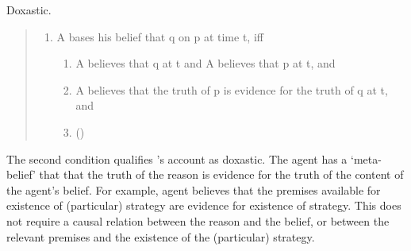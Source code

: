 \begin{note}[Doxastic]
  Doxastic.
  \cite{Tolliver:1982us}

  \begin{quote}
    \begin{enumerate}[label=(B)]
    \item A bases his belief that q on p at time t, iff
      \begin{enumerate}[label=(\arabic*)]
      \item A believes that q at t and A believes that p at t, and
      \item A believes that the truth of p is evidence for the truth of q at t, and
      \item \space[\dots]\footnotemark
        \mbox{}\hfill\mbox{(\citeyear[159]{Tolliver:1982us})}
      \end{enumerate}
    \end{enumerate}
    \end{quote}
    The second condition qualifies \citeauthor{Tolliver:1982us}'s account as doxastic.
    The agent has a `meta-belief' that that the truth of the reason is evidence for the truth of the content of the agent's belief.
    For example, agent believes that the premises available for existence of (particular) strategy are evidence for existence of strategy.
    This does not require a causal relation between the reason and the belief, or between the relevant premises and the existence of the (particular) strategy.


\end{note}
